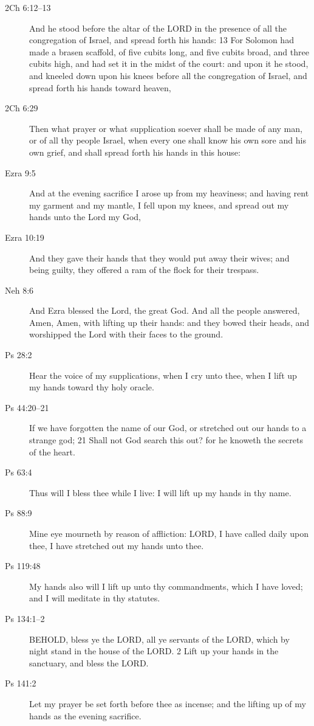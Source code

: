 \begin{description}
			\item[2Ch 6:12--13] And he stood before the altar of the LORD in the presence of all the congregation of Israel, and spread forth his hands: 13 For Solomon had made a brasen scaffold, of five cubits long, and five cubits broad, and three cubits high, and had set it in the midst of the court: and upon it he stood, and kneeled down upon his knees before all the congregation of Israel, and spread forth his hands toward heaven,
			\item[2Ch 6:29] Then what prayer or what supplication soever shall be made of any man, or of all thy people Israel, when every one shall know his own sore and his own grief, and shall spread forth his hands in this house:
			\item[Ezra 9:5] And at the evening sacrifice I arose up from my heaviness; and having rent my garment and my mantle, I fell upon my knees, and spread out my hands unto the Lord my God,
			\item[Ezra 10:19] And they gave their hands that they would put away their wives; and being guilty, they offered a ram of the flock for their trespass.
			\item[Neh 8:6] And Ezra blessed the Lord, the great God. And all the people answered, Amen, Amen, with lifting up their hands: and they bowed their heads, and worshipped the Lord with their faces to the ground.
			\item[Ps 28:2] Hear the voice of my supplications, when I cry unto thee, when I lift up my hands toward thy holy oracle.
			\item[Ps 44:20--21] If we have forgotten the name of our God, or stretched out our hands to a strange god; 21 Shall not God search this out? for he knoweth the secrets of the heart.
			\item[Ps 63:4] Thus will I bless thee while I live: I will lift up my hands in thy name.
			\item[Ps 88:9] Mine eye mourneth by reason of affliction: LORD, I have called daily upon thee, I have stretched out my hands unto thee.
			\item[Ps 119:48] My hands also will I lift up unto thy commandments, which I have loved; and I will meditate in thy statutes.
			\item[Ps 134:1--2] BEHOLD, bless ye the LORD, all ye servants of the LORD, which by night stand in the house of the LORD. 2 Lift up your hands in the sanctuary, and bless the LORD.
			\item[Ps 141:2] Let my prayer be set forth before thee as incense; and the lifting up of my hands as the evening sacrifice.

\end{description}
